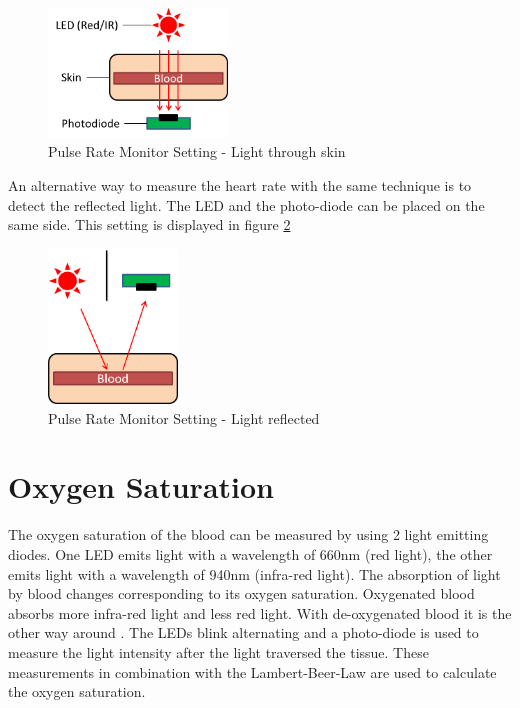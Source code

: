 \documentclass[notitlepage]{scrreprt}
\begin{document}
\begin{figure}[H]
	\centering
	\includegraphics[width=180px]{images/pulse-rate-aufbau.png}
	\caption{Pulse Rate Monitor Setting - Light through skin}
	\label{fig:pulse-rate-monitor-setting}
\end{figure}

\newpage

An alternative way to measure the heart rate with the same technique is to detect the reflected light. The LED and the photo-diode can be placed on the same side. This setting is displayed in figure \ref{fig:pulse-rate-monitor-setting2}

\begin{figure}[H]
	\centering
	\includegraphics[width=130px]{images/pulse-rate-aufbau2.png}
	\caption{Pulse Rate Monitor Setting - Light reflected}
	\label{fig:pulse-rate-monitor-setting2}
\end{figure}

\section{Oxygen Saturation}
The oxygen saturation of the blood can be measured by using 2 light emitting diodes. One LED emits light with a wavelength of 660nm (red light), the other emits light with a wavelength of 940nm (infra-red light). The absorption of light by blood changes corresponding to its oxygen saturation. Oxygenated blood absorbs more infra-red light and less red light. With de-oxygenated blood it is the other way around \cite{bib:pulse-oximetry}. The LEDs blink alternating and a photo-diode is used to measure the light intensity after the light traversed the tissue. These measurements in combination with the Lambert-Beer-Law are used to calculate the oxygen saturation.
\end{document}
